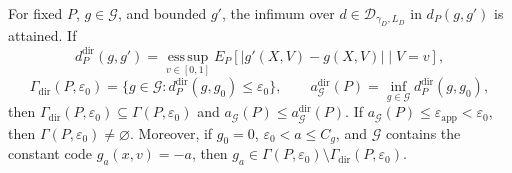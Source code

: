 For fixed \(P\), \(g\in\mathcal G\), and bounded \(g'\), the infimum over \(d\in\mathcal D_{\gamma_D,L_D}\) in \(d_P(g,g')\) is attained. If
\[
 d_P^{\mathrm{dir}}(g,g')=\operatorname*{ess\,sup}_{v\in[0,1]}
 E_P[|g'(X,V)-g(X,V)|\mid V=v],
\]
\[
 \Gamma_{\mathrm{dir}}(P,\varepsilon_0)
 =\{g\in\mathcal G:d_P^{\mathrm{dir}}(g,g_0)\le\varepsilon_0\},
 \qquad
 a_{\mathcal G}^{\mathrm{dir}}(P)=\inf_{g\in\mathcal G}d_P^{\mathrm{dir}}(g,g_0),
\]
then \(\Gamma_{\mathrm{dir}}(P,\varepsilon_0)\subseteq\Gamma(P,\varepsilon_0)\) and \(a_{\mathcal G}(P)\le a_{\mathcal G}^{\mathrm{dir}}(P)\). If \(a_{\mathcal G}(P)\le\varepsilon_{\mathrm{app}}<\varepsilon_0\), then \(\Gamma(P,\varepsilon_0)\ne\varnothing\). Moreover, if \(g_0=0\), \(\varepsilon_0<a\le C_g\), and \(\mathcal G\) contains the constant code \(g_a(x,v)=-a\), then \(g_a\in\Gamma(P,\varepsilon_0)\setminus\Gamma_{\mathrm{dir}}(P,\varepsilon_0)\).